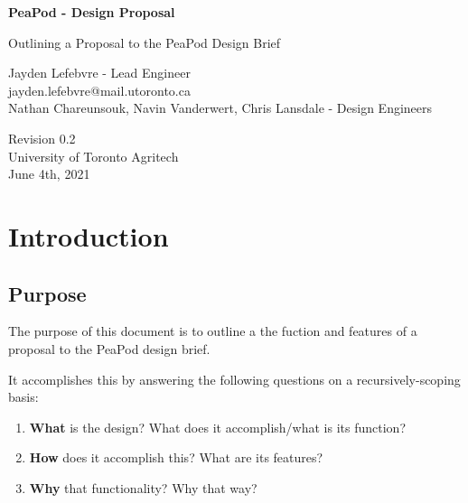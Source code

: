 \documentclass{report}
\begin{document}
\begin{titlepage}
    \begin{center}
        \vspace*{1.2cm}

        \textbf{\large{PeaPod - Design Proposal}}

        \vspace{0.5cm}

        Outlining a Proposal to the PeaPod Design Brief

        \vfill

        Jayden Lefebvre - Lead Engineer\\\small{jayden.lefebvre@mail.utoronto.ca}\\
        \vspace{1cm}
        Nathan Chareunsouk, Navin Vanderwert, Chris Lansdale - Design Engineers

        \vspace{2.5cm}

        Revision 0.2\\
        University of Toronto Agritech\\
        June 4th, 2021

    \end{center}
\end{titlepage}

\thispagestyle{plain}

\tableofcontents
\newpage

\section{Introduction}
\label{sec:intro}

\subsection{Purpose}
\label{sec:purpose}

The purpose of this document is to outline a the fuction and features of a proposal to the PeaPod design brief.

It accomplishes this by answering the following questions on a recursively-scoping basis:
\begin{enumerate}
    \item \textbf{What} is the design? What does it accomplish/what is its function? 
    \item \textbf{How} does it accomplish this? What are its features? 
    \item \textbf{Why} that functionality? Why that way?
\end{enumerate}
\end{document}
